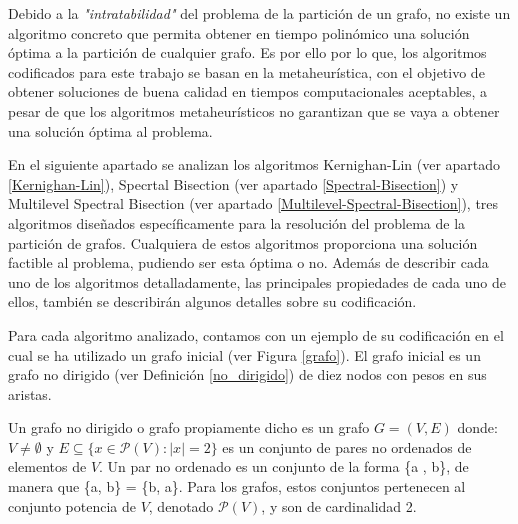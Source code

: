 Debido a la \textit{"intratabilidad"} del problema de la partición de un grafo, no existe un algoritmo concreto que permita obtener en tiempo polinómico una solución óptima a la partición de cualquier grafo. Es por ello por lo que, los algoritmos codificados para este trabajo se basan en la metaheurística, con el objetivo de obtener soluciones de buena calidad en tiempos computacionales aceptables, a pesar de que los algoritmos metaheurísticos no garantizan que se vaya a obtener una solución óptima al problema.

En el siguiente apartado se analizan los algoritmos Kernighan-Lin\cite{KernighanLin} (ver apartado \ref{Kernighan-Lin}), Specrtal Bisection (ver apartado \ref{Spectral-Bisection}) y Multilevel Spectral Bisection (ver apartado \ref{Multilevel-Spectral-Bisection}), tres algoritmos diseñados específicamente para la resolución del problema de la partición de grafos. Cualquiera de estos algoritmos proporciona una solución factible al problema, pudiendo ser esta óptima o no. Además de describir cada uno de los algoritmos detalladamente, las principales propiedades de cada uno de ellos, también se describirán algunos detalles sobre su codificación.

Para cada algoritmo analizado, contamos con un ejemplo de su codificación en el cual se ha utilizado un grafo inicial (ver Figura \ref{grafo}). El grafo inicial es un grafo no dirigido (ver Definición \ref{no_dirigido}) de diez nodos con pesos en sus aristas.

\begin{mydef}\label{no_dirigido}
	Un grafo no dirigido o grafo propiamente dicho es un grafo $G = (V , E)$ donde: $V\neq \emptyset$ y $E\subseteq \{x\in \mathcal P(V):|x|=2\}$ es un conjunto de pares no ordenados de elementos de $V$. Un par no ordenado es un conjunto de la forma \{a , b\}, de manera que \{a, b\} = \{b, a\}. Para los grafos, estos conjuntos pertenecen al conjunto potencia de $V$, denotado $\mathcal P(V)$, y son de cardinalidad 2. 
\end{mydef}

